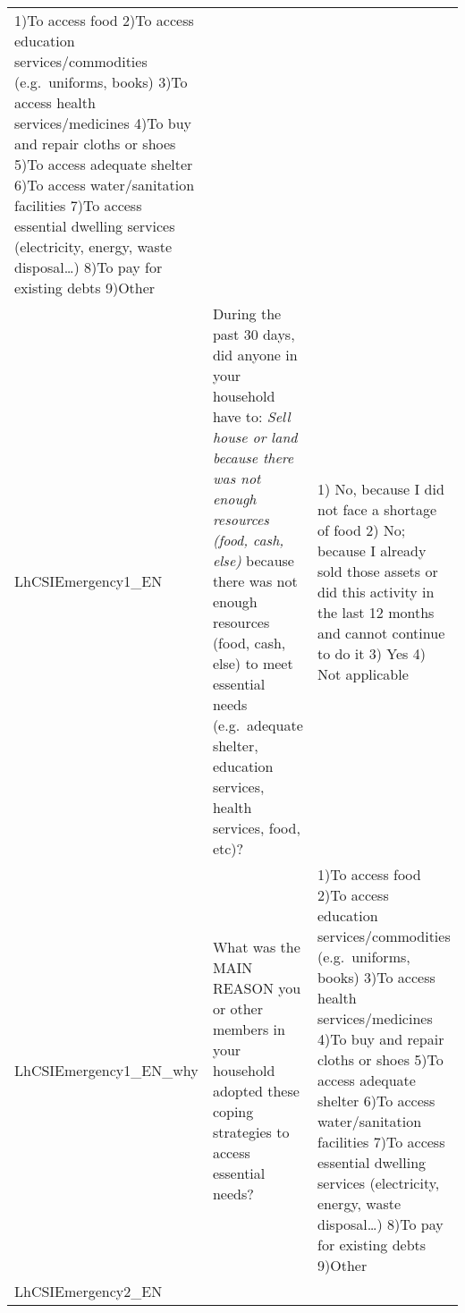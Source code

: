 \documentclass[
]{book}
\begin{document}
\begin{longtable}[]{@{}lll@{}}
\begin{minipage}[t]{0.43\columnwidth}
1)To access food 2)To access education services/commodities (e.g.~uniforms, books) 3)To access health services/medicines 4)To buy and repair cloths or shoes 5)To access adequate shelter 6)To access water/sanitation facilities 7)To access essential dwelling services (electricity, energy, waste disposal\ldots) 8)To pay for existing debts 9)Other\strut
\end{minipage}\tabularnewline
\begin{minipage}[t]{0.11\columnwidth}\raggedright
LhCSIEmergency1\_EN\strut
\end{minipage} & \begin{minipage}[t]{0.37\columnwidth}\raggedright
During the past 30 days, did anyone in your household have to: \emph{Sell house or land because there was not enough resources (food, cash, else)} because there was not enough resources (food, cash, else) to meet essential needs (e.g.~adequate shelter, education services, health services, food, etc)?\strut
\end{minipage} & \begin{minipage}[t]{0.43\columnwidth}\raggedright
1) No, because I did not face a shortage of food 2) No; because I already sold those assets or did this activity in the last 12 months and cannot continue to do it 3) Yes 4) Not applicable\strut
\end{minipage}\tabularnewline
\begin{minipage}[t]{0.11\columnwidth}\raggedright
LhCSIEmergency1\_EN\_why\strut
\end{minipage} & \begin{minipage}[t]{0.37\columnwidth}\raggedright
What was the MAIN REASON you or other members in your household adopted these coping strategies to access essential needs?\strut
\end{minipage} & \begin{minipage}[t]{0.43\columnwidth}\raggedright
1)To access food 2)To access education services/commodities (e.g.~uniforms, books) 3)To access health services/medicines 4)To buy and repair cloths or shoes 5)To access adequate shelter 6)To access water/sanitation facilities 7)To access essential dwelling services (electricity, energy, waste disposal\ldots) 8)To pay for existing debts 9)Other\strut
\end{minipage}\tabularnewline
\begin{minipage}[t]{0.11\columnwidth}\raggedright
LhCSIEmergency2\_EN\strut
\end{minipage} & \begin{minipage}[t]{0.37\columnwidth}\raggedright

\end{minipage}
\end{longtable}
\end{document}
